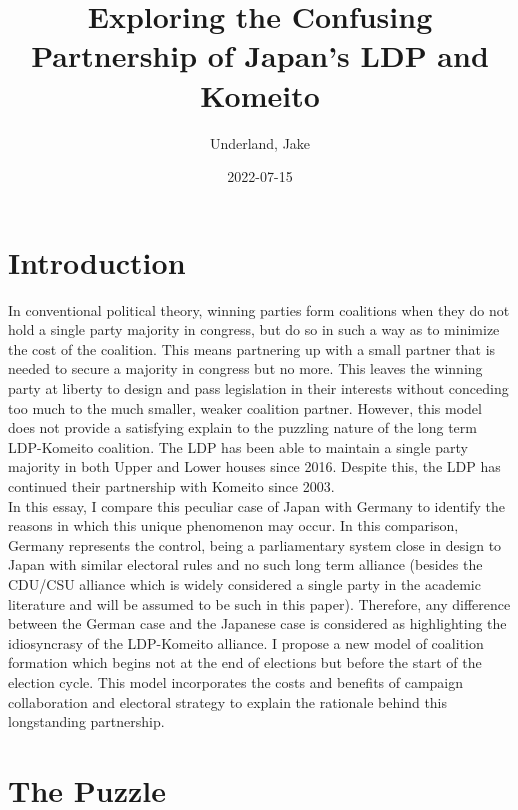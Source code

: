 \documentclass[
]{article}
\title{Exploring the Confusing Partnership of Japan's LDP and Komeito}
\author{Underland, Jake}
\date{2022-07-15}
\begin{document}
\maketitle

{
\setcounter{tocdepth}{2}
\tableofcontents
}
\hypertarget{introduction}{%
\section{Introduction}\label{introduction}}

In conventional political theory, winning parties form coalitions when
they do not hold a single party majority in congress, but do so in such
a way as to minimize the cost of the coalition. This means partnering up
with a small partner that is needed to secure a majority in congress but
no more. This leaves the winning party at liberty to design and pass
legislation in their interests without conceding too much to the much
smaller, weaker coalition partner. However, this model does not provide
a satisfying explain to the puzzling nature of the long term LDP-Komeito
coalition. The LDP has been able to maintain a single party majority in
both Upper and Lower houses since 2016. Despite this, the LDP has
continued their partnership with Komeito since 2003.\\
\hspace*{0.333em}\hspace*{0.333em}\hspace*{0.333em}\hspace*{0.333em}In
this essay, I compare this peculiar case of Japan with Germany to
identify the reasons in which this unique phenomenon may occur. In this
comparison, Germany represents the control, being a parliamentary system
close in design to Japan with similar electoral rules and no such long
term alliance (besides the CDU/CSU alliance which is widely considered a
single party in the academic literature and will be assumed to be such
in this paper). Therefore, any difference between the German case and
the Japanese case is considered as highlighting the idiosyncrasy of the
LDP-Komeito alliance. I propose a new model of coalition formation which
begins not at the end of elections but before the start of the election
cycle. This model incorporates the costs and benefits of campaign
collaboration and electoral strategy to explain the rationale behind
this longstanding partnership.

\hypertarget{the-puzzle}{%
\section{The Puzzle}\label{the-puzzle}}
\end{document}
